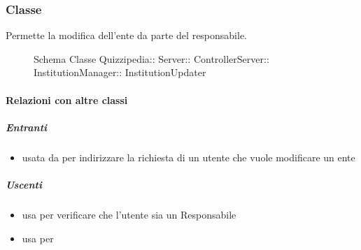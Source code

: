 \subsubsection{Classe }
Permette la modifica dell'ente da parte del responsabile.
\begin{figure}[H]
\centering
\noindent{}
\caption[Schema Classe InstitutionUpdater]{Schema Classe Quizzipedia:: Server:: ControllerServer:: InstitutionManager:: InstitutionUpdater}
\end{figure}
\paragraph{Relazioni con altre classi}
\subparagraph{Entranti}
\begin{itemize}
\item usata da  per indirizzare la richiesta di un utente che vuole modificare un ente
\end{itemize}
\subparagraph{Uscenti}
\begin{itemize}
\item usa  per verificare che l'utente sia un Responsabile
\item usa  per 
\end{itemize}
